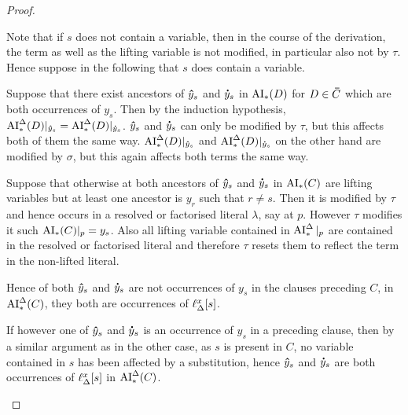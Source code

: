 \documentclass[,%
	draft=false,%
	numbers=noendperiod
	11pt,
	a4paper,
	oneside,%
	openany,
]{memoir}
\begin{document}
\begin{proof}
\begin{description}
\begin{itemize}
					Note that if $s$ does not contain a variable, then in the course of the derivation, the term as well as the lifting variable is not modified, in particular also not by $\tau$.
					Hence suppose in the following that $s$ does contain a variable.

					Suppose that there exist ancestors of $\bm\hat y_s$ and $\bm\dot y_s$ in $\operatorname{AI}_\mathrm{*}(D)$ for $D\in\bm\bar C$ which are both occurrences of $y_s$.
					Then by the induction hypothesis, $\operatorname{AI}_\mathrm{*}^\Delta(D)|_{\bm\hat y_s} = \operatorname{AI}_\mathrm{*}^\Delta(D)|_{\bm\dot y_s}$.
					$\bm\hat y_s$ and $\bm\dot y_s$ can only be modified by $\tau$, but this affects both of them the same way.
					$\operatorname{AI}_\mathrm{*}^\Delta(D)|_{\bm\hat y_s}$ and $\operatorname{AI}_\mathrm{*}^\Delta(D)|_{\bm\dot y_s}$ on the other hand are modified by $\sigma$, but this again affects both terms the same way.

					Suppose that otherwise at both ancestors of $\bm\hat y_s$ and $\bm\dot y_s$ in $\operatorname{AI}_\mathrm{*}(C)$ are lifting variables but at least one ancestor is $y_r$ such that $r\neq s$.
					Then it is modified by $\tau$ and hence occurs in a resolved or factorised literal $\lambda$, say at $p$.
					However $\tau$ modifies it such $\operatorname{AI}_\mathrm{*}(C)|_{p} = y_s$. Also all lifting variable contained in $\operatorname{AI}_\mathrm{*}^\Delta|_{p}$ are contained in the resolved or factorised literal and therefore $\tau$ resets them to reflect the term in the non-lifted literal.

					Hence of both $\bm\hat y_s$ and $\bm\dot y_s$ are not occurrences of $y_s$ in the clauses preceding $C$, in $\operatorname{AI}_\mathrm{*}^\Delta(C)$, they both are occurrences of $\ell_{\Delta}^{x}[s]$.

					If however one of $\bm\hat y_s$ and $\bm\dot y_s$ is an occurrence of $y_s$ in a preceding clause, then by a similar argument as in the other case, as $s$ is present in $C$, no variable contained in $s$ has been affected by a substitution, hence $\bm\hat y_s$ and $\bm\dot y_s$ are both occurrences of $\ell_{\Delta}^{x}[s]$ in $\operatorname{AI}_\mathrm{*}^\Delta(C)$.
					\qedhere

			\end{itemize}
	\end{description}
\end{proof}
\end{document}
